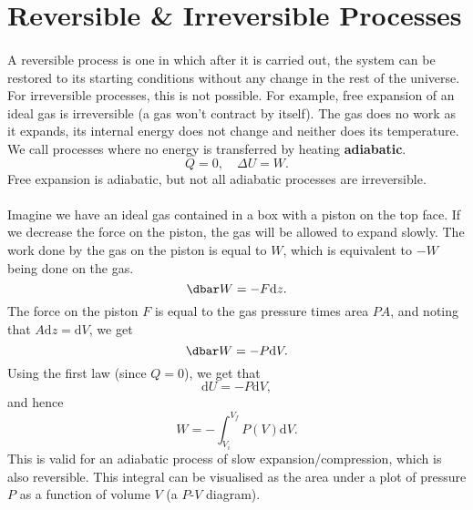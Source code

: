 \documentclass[../thermodynamics.tex]{subfiles}
\begin{document}
    \section{Reversible \& Irreversible Processes}
        \paragraph{}
        A reversible process is one in which after it is carried out, the system can be restored to its starting conditions without any change in the rest of the universe.
        For irreversible processes, this is not possible.
        For example, free expansion of an ideal gas is irreversible (a gas won't contract by itself).
        The gas does no work as it expands, its internal energy does not change and neither does its temperature.
        We call processes where no energy is transferred by heating \textbf{adiabatic}.
        \begin{equation}
            Q=0,\quad\Delta U=W.
        \end{equation}
        Free expansion is adiabatic, but not all adiabatic processes are irreversible.

        \paragraph{}
        Imagine we have an ideal gas contained in a box with a piston on the top face.
        If we decrease the force on the piston, the gas will be allowed to expand slowly.
        The work done by the gas on the piston is equal to $W$, which is equivalent to $-W$ being done on the gas.
        \begin{equation}
            \dbar W=-F\mathrm{d}z.
        \end{equation}
        The force on the piston $F$ is equal to the gas pressure times area $PA$, and noting that $A\mathrm{d}z=\mathrm{d}V$, we get
        \begin{equation}
            \dbar W=-P\mathrm{d}V.
        \end{equation}
        Using the first law (since $Q=0$), we get that
        \begin{equation}
            \mathrm{d}U=-P\mathrm{d}V,
        \end{equation}
        and hence
        \begin{equation}
            W=-\int_{V_i}^{V_f}P(V)\mathrm{d}V.
        \end{equation}
        This is valid for an adiabatic process of slow expansion/compression, which is also reversible.
        This integral can be visualised as the area under a plot of pressure $P$ as a function of volume $V$ (a $P$-$V$ diagram).
\end{document}
